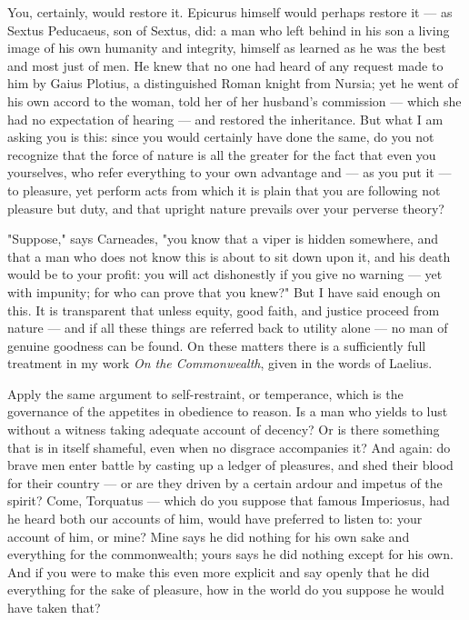  You, certainly, would restore it. Epicurus himself would perhaps restore it — as Sextus Peducaeus, son of Sextus, did: a man who left behind in his son a living image of his own humanity and integrity, himself as learned as he was the best and most just of men. He knew that no one had heard of any request made to him by Gaius Plotius, a distinguished Roman knight from Nursia; yet he went of his own accord to the woman, told her of her husband's commission — which she had no expectation of hearing — and restored the inheritance. But what I am asking you is this: since you would certainly have done the same, do you not recognize that the force of nature is all the greater for the fact that even you yourselves, who refer everything to your own advantage and — as you put it — to pleasure, yet perform acts from which it is plain that you are following not pleasure but duty, and that upright nature prevails over your perverse theory?

 "Suppose," says Carneades, "you know that a viper is hidden somewhere, and that a man who does not know this is about to sit down upon it, and his death would be to your profit: you will act dishonestly if you give no warning — yet with impunity; for who can prove that you knew?" But I have said enough on this. It is transparent that unless equity, good faith, and justice proceed from nature — and if all these things are referred back to utility alone — no man of genuine goodness can be found. On these matters there is a sufficiently full treatment in my work \textit{On the Commonwealth}, given in the words of Laelius.

 Apply the same argument to self-restraint, or temperance, which is the governance of the appetites in obedience to reason. Is a man who yields to lust without a witness taking adequate account of decency? Or is there something that is in itself shameful, even when no disgrace accompanies it? And again: do brave men enter battle by casting up a ledger of pleasures, and shed their blood for their country — or are they driven by a certain ardour and impetus of the spirit? Come, Torquatus — which do you suppose that famous Imperiosus, had he heard both our accounts of him, would have preferred to listen to: your account of him, or mine? Mine says he did nothing for his own sake and everything for the commonwealth; yours says he did nothing except for his own. And if you were to make this even more explicit and say openly that he did everything for the sake of pleasure, how in the world do you suppose he would have taken that?



